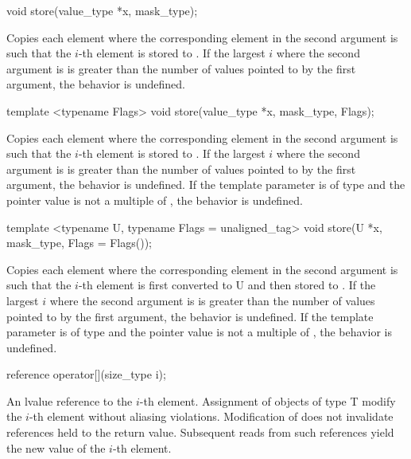 \begin{wgText}
  \begin{itemdecl}
void store(value_type *x, mask_type);
  \end{itemdecl}
  \begin{itemdescr}
    \pnum\effects Copies each element where the corresponding element in the second argument is \true such that the $i$-th element is stored to .
    \pnum\remarks If the largest $i$ where the second argument is \true is greater than the number of values pointed to by the first argument, the behavior is undefined.
  \end{itemdescr}

  \begin{itemdecl}
template <typename Flags> void store(value_type *x, mask_type, Flags);
  \end{itemdecl}
  \begin{itemdescr}
    \pnum\effects Copies each element where the corresponding element in the second argument is \true such that the $i$-th element is stored to .
    \pnum\remarks If the largest $i$ where the second argument is \true is greater than the number of values pointed to by the first argument, the behavior is undefined.
    \pnum         If the template parameter is of type  and the pointer value is not a multiple of , the behavior is undefined.
  \end{itemdescr}

  \begin{itemdecl}
template <typename U, typename Flags = unaligned_tag> void store(U *x, mask_type, Flags = Flags());
  \end{itemdecl}
  \begin{itemdescr}
    \pnum\effects Copies each element where the corresponding element in the second argument is \true such that the $i$-th element is first converted to \type U and then stored to .
    \pnum\remarks If the largest $i$ where the second argument is \true is greater than the number of values pointed to by the first argument, the behavior is undefined.
    \pnum         If the template parameter is of type  and the pointer value is not a multiple of , the behavior is undefined.
  \end{itemdescr}

  \begin{itemdecl}
reference operator[](size_type i);
  \end{itemdecl}
  \begin{itemdescr}
    \pnum\returns An lvalue reference to the $i$-th element.
    \pnum\postconditions Assignment of objects of type \type T modify the $i$-th element without aliasing violations.
    \pnum                Modification of  does not invalidate references held to the return value.
    Subsequent reads from such references yield the new value of the $i$-th element.
  \end{itemdescr}


\end{wgText}
